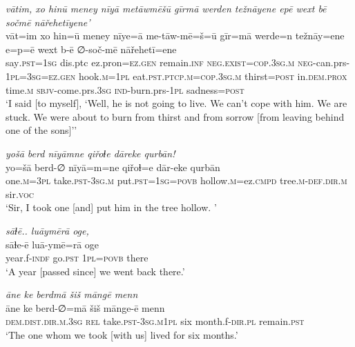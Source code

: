 \ea \label{ZQ.25}
\textit{vātim, xo hinū meney nīyā metāwmēšū gīrmā werden težnāyene epē wext bē sočmē nāřehetīyene’} \\ 
\gll vāt=im xo hin=ū meney nīye=ā me-tāw-mē=š=ū gīr=mā werde=n težnāy=ene e=p=ē wext b-ē ∅-soč-mē nāřehetī=ene \\ 
 say\textsc{.pst}\textsc{=\textsc{1sg}} dis.ptc ez.pron\textsc{=ez.gen} remain\textsc{.inf} \textsc{\textsc{neg.}exist}\textsc{=cop}\textsc{.3sg}\textsc{.m} \textsc{neg-}can.prs\textsc{-\textsc{1pl}}\textsc{=3sg}\textsc{=ez.gen} hook\textsc{.m}\textsc{=\textsc{1pl}} eat\textsc{.pst}\textsc{.ptcp}\textsc{.m}\textsc{=cop}\textsc{.3sg}\textsc{.m} thirst\textsc{=\textsc{post}} in.\textsc{dem.prox} time\textsc{.m} \textsc{sbjv-}come.prs\textsc{.3sg} \textsc{ind-}burn.prs\textsc{-\textsc{1pl}} sadness\textsc{=\textsc{post}} \\ 
\glt `I said [to myself], ‘Well, he is not going to live. We can’t cope with him. We are stuck. We were about to burn from thirst and from sorrow [from leaving behind one of the sons]’'
\z 
 
\ea \label{ZQ.26}
\textit{yošā berd nīyāmne qiřoɫe dāreke qurbān!} \\ 
\gll yo=šā berd-∅ nīyā=m=ne qiřoɫ=e dār-eke qurbān \\ 
 one\textsc{.m}\textsc{=3pl} take\textsc{.pst}\textsc{-3sg}\textsc{.m} put\textsc{.pst}\textsc{=\textsc{1sg}}\textsc{=\textsc{povb}} hollow\textsc{.m}=ez\textsc{.cmpd} tree\textsc{.m}\textsc{-def}\textsc{.dir}\textsc{.m} sir.\textsc{voc} \\ 
\glt `Sir, I took one [and] put him in the tree hollow. '
\z 
 
\ea \label{ZQ.28}
\textit{sāɫē.. luāymērā oge,} \\ 
\gll sāɫe-ē luā-ymē=rā oge \\ 
 year.f\textsc{-indf} go\textsc{.pst} \textsc{1pl}\textsc{=\textsc{povb}} there \\ 
\glt `A year [passed since] we went back there.'
\z 
 
\ea \label{ZQ.29}
\textit{āne ke berdmā šiš māngē menn} \\ 
\gll āne ke berd-∅=mā šiš mānge-ē menn \\ 
 \textsc{dem.dist}\textsc{.dir}\textsc{.m}\textsc{.3sg} \textsc{rel} take\textsc{.pst}\textsc{-3sg}\textsc{.m}\textsc{1pl} six month.f\textsc{-dir}\textsc{.pl} remain\textsc{.pst} \\ 
\glt `The one whom we took [with us] lived for six months.'
\z 
 
